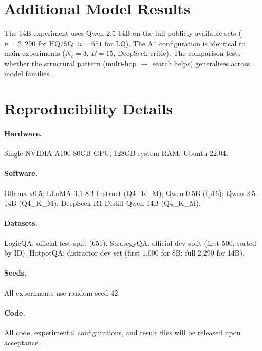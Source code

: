 \documentclass[11pt]{article}
\begin{document}
\section{Additional Model Results}
\label{app:additional_models}

The 14B experiment uses Qwen-2.5-14B on the full publicly available sets
($n{=}2{,}290$ for HQ/SQ; $n{=}651$ for LQ).  The A* configuration is
identical to main experiments ($N_c{=}3$, $B{=}15$, DeepSeek critic).  The
comparison tests whether the structural pattern (multi-hop $\rightarrow$ search
helps) generalises across model families.

\section{Reproducibility Details}
\label{app:reproducibility}

\paragraph{Hardware.}
Single NVIDIA A100 80GB GPU; 128GB system RAM; Ubuntu 22.04.

\paragraph{Software.}
Ollama v0.5; LLaMA-3.1-8B-Instruct (Q4\_K\_M); Qwen-0.5B (fp16);
Qwen-2.5-14B (Q4\_K\_M); DeepSeek-R1-Distill-Qwen-14B (Q4\_K\_M).

\paragraph{Datasets.}
LogicQA: official test split (651).  StrategyQA: official dev split (first
500, sorted by ID).  HotpotQA: distractor dev set (first 1,000 for 8B; full
2,290 for 14B).

\paragraph{Seeds.}
All experiments use random seed 42.

\paragraph{Code.}
All code, experimental configurations, and result files will be released upon
acceptance.
\end{document}

